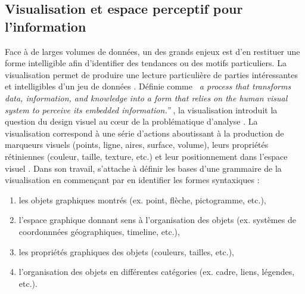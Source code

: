 \subsection[Visualisation et espace perceptif pour l{\textquoteright}information]{Visualisation et espace perceptif pour l{\textquoteright}information}

Face à de larges volumes de données, un des grands enjeux est d{\textquoteright}en restituer une forme intelligible afin d{\textquoteright}identifier des tendances ou des motifs particuliers. La visualisation permet de produire une lecture particulière de parties intéressantes et intelligibles d{\textquoteright}un jeu de données \citep{Cairo2013}. Définie comme \textit{{\guillemotleft}~a process that transforms data, information, and knowledge into a form that relies on the human visual system to perceive its embedded information.{\textquotedblright}} \citep{Graffieti2010}, la visualisation introduit la question du design visuel au c{\oe}ur de la problématique d{\textquoteright}analyse \citep{Wesolowsky1992}. La visualisation correspond à une série d{\textquoteright}actions aboutissant à la production de marqueurs visuels (points, ligne, aires, surface, volume), leurs propriétés rétiniennes (couleur, taille, texture, etc.) et leur positionnement dans l{\textquoteright}espace visuel \citep{Card1997}. Dans son travail, \cite{Engelhardt2007} s’attache à définir les bases d{\textquoteright}une grammaire de la visualisation en commen\c{c}ant par en identifier les formes syntaxiques :  

\begin{enumerate}
    \item les objets graphiques montrés (ex. point, flèche, pictogramme, etc.), 
    \item l{\textquoteright}espace graphique donnant sens à l{\textquoteright}organisation des objets (ex. systèmes de coordonnnées géographiques, timeline, etc.), 
    \item les propriétés graphiques des objets (couleurs, tailles, etc.), 
    \item l{\textquoteright}organisation des objets en différentes catégories (ex. cadre, liens, légendes, etc.). 
\end{enumerate}

